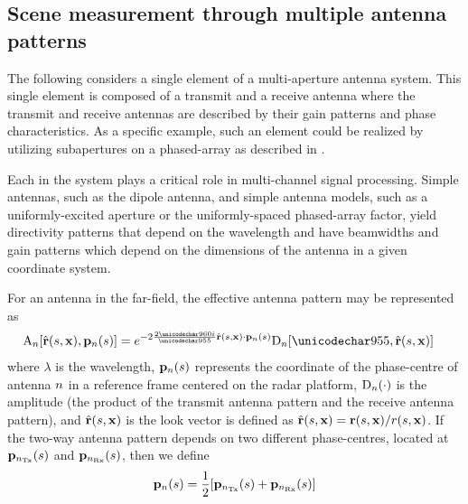 \subsection{Scene measurement through multiple antenna patterns}
The following considers a single element of a multi-aperture antenna system. This single element is composed of a transmit and a receive antenna where the transmit and receive antennas are described by their gain patterns and phase characteristics. As a specific example, such an element could be realized by utilizing subapertures on a phased-array as described in .
\par
Each  in the system plays a critical role in multi-channel signal processing. Simple antennas, such as the dipole antenna, and simple antenna models, such as a uniformly-excited aperture or the uniformly-spaced phased-array factor, yield directivity patterns that depend on the wavelength and have beamwidths and gain patterns which depend on the dimensions of the antenna in a given coordinate system. 
\par
For an antenna in the far-field, the effective antenna pattern may be represented as
\begin{equation}
\begin{split}
\pattern{\channelIndex}[\uRangeVectorParm, \pAntennaParm{\channelIndex}]&=\eex{-2\frac{2\pi\im}{\lambda}\uRangeVectorParm\cdot\pAntennaParm{\channelIndex}}\dPattern{\channelIndex}[\lambda, \uRangeVectorParm]
\label{eq:antennaArgument}
\end{split}
\end{equation}
where $\lambda$ is the  wavelength, $\mathbf{p}_{n}(s)$ represents the coordinate of the phase-centre of antenna $n$ in a reference frame centered on the radar platform, $\text{D}_{n}(\cdot)$ is the  amplitude (the product of the transmit antenna pattern and the receive antenna pattern), and $\hat{\mathbf{r}}(s, \mathbf{\mathbf{x}})$ is the look vector is defined as $\hat{\mathbf{r}}(s, \mathbf{\mathbf{x}})=\mathbf{r}(s, \mathbf{\mathbf{x}})/\mathnormal{r}(s, \mathbf{\mathbf{x}})$. If the two-way antenna pattern depends on two different phase-centres, located at $\mathbf{p}_{n_{\text{Tx}}}(s)$ and $\mathbf{p}_{n_{\text{Rx}}}(s)$, then we define
\begin{equation}
 \mathbf{p}_{n}(s)=\frac{1}{2}[\mathbf{p}_{n_{\text{Tx}}}(s)+\mathbf{p}_{n_{\text{Rx}}}(s)]
\end{equation}
\par
